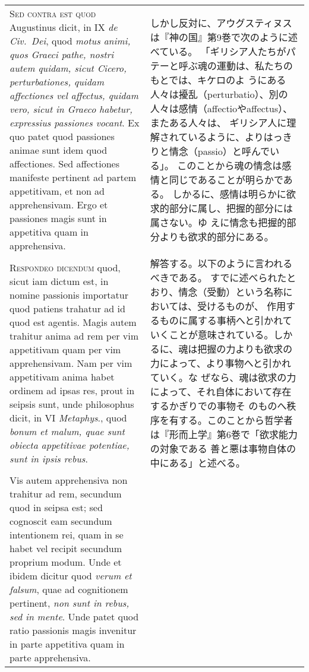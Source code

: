 \documentclass[10pt]{jsarticle} %
\begin{document}
\begin{longtable}{p{21em}p{21em}}
\\


{\scshape Sed contra est quod} Augustinus dicit, in IX {\itshape de
 Civ.~Dei}, quod {\itshape motus
 animi, quos Graeci pathe, nostri autem quidam, sicut Cicero,
 perturbationes, quidam affectiones vel affectus, quidam vero, sicut in
 Graeco habetur, expressius passiones vocant}. Ex quo patet quod
 passiones animae sunt idem quod affectiones. Sed affectiones manifeste
 pertinent ad partem appetitivam, et non ad apprehensivam. Ergo et
 passiones magis sunt in appetitiva quam in apprehensiva.


&

しかし反対に、アウグスティヌスは『神の国』第9巻で次のように述べている。
 「ギリシア人たちがパテーと呼ぶ魂の運動は、私たちのもとでは、キケロのよ
 うにある人々は擾乱（perturbatio）、別の人々は感情（affectioやaffectus）、またある人々は、
 ギリシア人に理解されているように、よりはっきりと情念（passio）と呼んでいる」。
 このことから魂の情念は感情と同じであることが明らかである。
しかるに、感情は明らかに欲求的部分に属し、把握的部分には属さない。ゆ
 えに情念も把握的部分よりも欲求的部分にある。

\\



{\scshape Respondeo dicendum} quod, sicut iam dictum est, in nomine passionis
 importatur quod patiens trahatur ad id quod est agentis. Magis autem
 trahitur anima ad rem per vim appetitivam quam per vim
 apprehensivam. Nam per vim appetitivam anima habet ordinem ad ipsas
 res, prout in seipsis sunt, unde philosophus dicit, in VI {\itshape Metaphys}.,
 quod {\itshape bonum et malum, quae sunt obiecta appetitivae potentiae, sunt in
 ipsis rebus}. 


&


解答する。以下のように言われるべきである。
すでに述べられたとおり、情念（受動）という名称においては、受けるものが、
 作用するものに属する事柄へと引かれていくことが意味されている。しか
 るに、魂は把握の力よりも欲求の力によって、より事物へと引かれていく。な
 ぜなら、魂は欲求の力によって、それ自体において存在するかぎりでの事物そ
 のものへ秩序を有する。このことから哲学者は『形而上学』第6巻で「欲求能力の対象である
 善と悪は事物自体の中にある」と述べる。

\\

Vis autem apprehensiva non trahitur ad rem, secundum quod
 in seipsa est; sed cognoscit eam secundum intentionem rei, quam in se
 habet vel recipit secundum proprium modum. Unde et ibidem dicitur quod
 {\itshape verum et falsum}, quae ad cognitionem pertinent, {\itshape non sunt in rebus, sed
 in mente}. Unde patet quod ratio passionis magis invenitur in parte
 appetitiva quam in parte apprehensiva.



\end{longtable}
\end{document}
